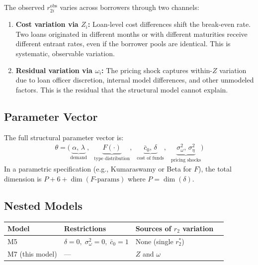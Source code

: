 \documentclass[12pt]{article}
\theoremstyle{plain}
\theoremstyle{plain}
\theoremstyle{definition}  %
\theoremstyle{remark}  %
\begin{document}
The observed $r_{2i}^{\text{obs}}$ varies across borrowers through two channels:
\begin{enumerate}
    \item \textbf{Cost variation via $Z_i$:} Loan-level cost differences shift the break-even rate. Two loans originated in different months or with different maturities receive different entrant rates, even if the borrower pools are identical. This is systematic, observable variation.
    \item \textbf{Residual variation via $\omega_i$:} The pricing shock captures within-$Z$ variation due to loan officer discretion, internal model differences, and other unmodeled factors. This is the residual that the structural model cannot explain.
\end{enumerate}

\subsection{Parameter Vector}

The full structural parameter vector is:
\begin{align}\label{eq:theta}
    \theta = \big(\underbrace{\alpha,\, \lambda}_{\text{demand}},\;\; \underbrace{F(\cdot)}_{\text{type distribution}},\;\; \underbrace{\bar{c}_0,\, \delta}_{\text{cost of funds}},\;\; \underbrace{\sigma_\omega^2,\, \sigma_\eta^2}_{\text{pricing shocks}}\big)
\end{align}
In a parametric specification (e.g., Kumaraswamy or Beta for $F$), the total dimension is $P + 6 + \dim(F\text{-params})$ where $P = \dim(\delta)$.

\subsection{Nested Models}

\begin{center}
\renewcommand{\arraystretch}{1.3}
\begin{tabular}{llll}
\toprule
\textbf{Model} & \textbf{Restrictions} & \textbf{Sources of $r_2$ variation} \\
\midrule
M5 & $\delta = 0,\; \sigma_\omega^2 = 0,\; \bar{c}_0 = 1$ & None (single $r_2^*$) \\
M7 (this model) & --- & $Z$ and $\omega$ \\
\bottomrule
\end{tabular}
\end{center}


\end{document}
